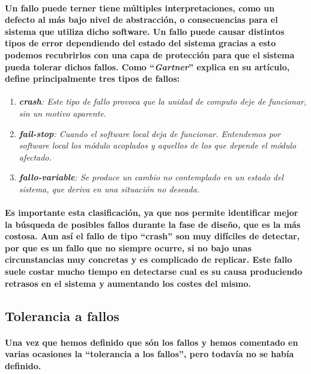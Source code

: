 \documentclass{./llncs2e/llncs}
\begin{document}
\paragraph{
Un fallo puede terner tiene m\'{u}ltiples interpretaciones, como un defecto al m\'{a}s bajo nivel de abstracci\'{o}n, o consecuencias para el sistema que utiliza dicho software. Un fallo puede causar distintos tipos de error dependiendo del estado del sistema gracias a esto podemos recubrirlos con una capa de protección para que el sistema pueda tolerar dichos fallos. Como ``\textit{Gartner}'' explica en su art\'{i}culo, define principalmente tres tipos de fallos:}
\begin{enumerate}
\item \textit{\textbf{crash}: Este tipo de fallo provoca que la unidad de computo deje de funcionar, sin un motivo aparente.}
\item \textit{\textbf{fail-stop}: Cuando el software local deja de funcionar. Entendemos por software local los m\'{o}dulo acoplados y aquellos de los que depende el m\'{o}dulo afectado.}
\item \textit{\textbf{fallo-variable}: Se produce un cambio no contemplado en un estado del sistema, que deriva en una situación no deseada.}
\end{enumerate}

\paragraph{
Es importante esta clasificación, ya que nos permite identificar mejor la b\'{u}squeda de posibles fallos durante la fase de diseño, que es la m\'{a}s costosa. Aun as\'{i} el fallo de tipo ``crash'' son muy dif\'{i}ciles de detectar, por que es un fallo que no siempre ocurre, si no bajo unas circunstancias muy concretas y es complicado de replicar. Este fallo suele costar mucho tiempo en detectarse cual es su causa produciendo retrasos en el sistema y aumentando los costes del mismo.
}

\subsection{Tolerancia a fallos}
\paragraph{
Una vez que hemos definido que s\'{o}n los fallos y hemos comentado en varias ocasiones la ``tolerancia a los fallos'', pero todav\'{i}a no se hab\'{i}a definido.
}
\end{document}
